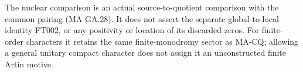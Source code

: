 The nuclear comparison is an actual source-to-quotient
comparison with the common pairing (MA-GA.28).  It
does not assert the separate global-to-local identity
FT002, or any positivity or location of its discarded
zeros.  For finite-order characters it retains the same
finite-monodromy sector as MA-CQ; allowing a general
unitary compact character does not assign it an
unconstructed finite Artin motive.

